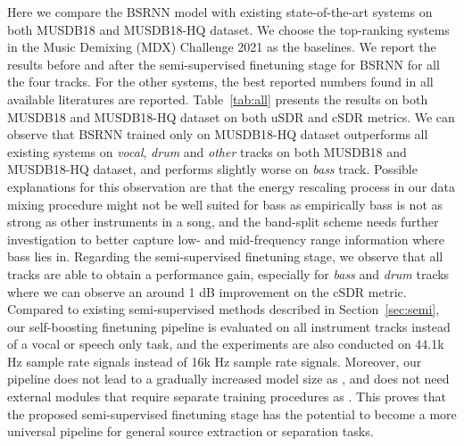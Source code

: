Here we compare the BSRNN model with existing state-of-the-art systems on both MUSDB18 and MUSDB18-HQ dataset. We choose the top-ranking systems in the Music Demixing (MDX) Challenge 2021 \cite{mitsufuji2021music} as the baselines. We report the results before and after the semi-supervised finetuning stage for BSRNN for all the four tracks. For the other systems, the best reported numbers found in all available literatures are reported. Table~\ref{tab:all} presents the results on both MUSDB18 and MUSDB18-HQ dataset on both uSDR and cSDR metrics. We can observe that BSRNN trained only on MUSDB18-HQ dataset outperforms all existing systems on \textit{vocal}, \textit{drum} and \textit{other} tracks on both MUSDB18 and MUSDB18-HQ dataset, and performs slightly worse on \textit{bass} track. Possible explanations for this observation are that the energy rescaling process in our data mixing procedure might not be well suited for bass as empirically bass is not as strong as other instruments in a song, and the band-split scheme needs further investigation to better capture low- and mid-frequency range information where bass lies in. Regarding the semi-supervised finetuning stage, we observe that all tracks are able to obtain a performance gain, especially for \textit{bass} and \textit{drum} tracks where we can observe an around 1 dB improvement on the cSDR metric. Compared to existing semi-supervised methods described in Section~\ref{sec:semi}, our self-boosting finetuning pipeline is evaluated on all instrument tracks instead of a vocal or speech only task, and the experiments are also conducted on 44.1k Hz sample rate signals instead of 16k Hz sample rate signals. Moreover, our pipeline does not lead to a gradually increased model size as \cite{tzinis2022remixit}, and does not need external modules that require separate training procedures as \cite{defossez2019demucs, wang2021semi}. This proves that the proposed semi-supervised finetuning stage has the potential to become a more universal pipeline for general source extraction or separation tasks.